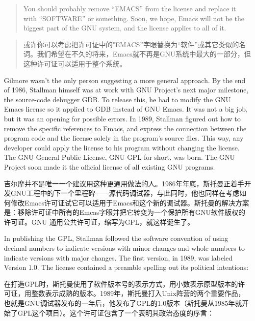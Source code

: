 \ifdefined\eng
\begin{quote}
You should probably remove ``EMACS'' from the license and replace it with ``SOFTWARE'' or something. Soon, we hope, Emacs will not be the biggest part of the GNU system, and the license applies to all of it.
\end{quote}
\fi

\ifdefined\chs
\begin{quote}
或许你可以考虑把许可证中的"EMACS''字眼替换为``软件''或其它类似的名词。我们希望在不久的将来，Emacs就不再是GNU系统中最大的一部分，但这种许可证可以适用于整个系统。 
\end{quote}
\fi

\ifdefined\eng
Gilmore wasn't the only person suggesting a more general approach. By the end of 1986, Stallman himself was at work with GNU Project's next major milestone, the source-code debugger GDB.  To release this, he had to modify the GNU Emacs license so it applied to GDB instead of GNU Emacs.  It was not a big job, but it was an opening for possible errors.  In 1989, Stallman figured out how to remove the specific references to Emacs, and express the connection between the program code and the license solely in the program's source files.  This way, any developer could apply the license to his program without changing the license. The GNU General Public License, GNU GPL for short, was born.  The GNU Project soon made it the official license of all existing GNU programs.
\fi

\ifdefined\chs
吉尔摩并不是唯一一个建议用这种更通用做法的人。1986年年底，斯托曼正着手开发GNU工程中的下一个里程碑——源代码调试器，与此同时，他也同样在考虑如何修改Emacs许可证试它可以适用于Emacs和这个新的调试器。斯托曼的解决方案是：移除许可证中所有的Emcas字眼并把它转变为一个保护所有GNU软件版权的许可证。GNU 通用公共许可证，缩写为GPL，就这样诞生了。
\fi

\ifdefined\eng
In publishing the GPL, Stallman followed the software convention of using decimal numbers to indicate versions with minor changes and whole numbers to indicate versions with major changes. The first version, in 1989, was labeled Version 1.0. The license contained a preamble spelling out its political intentions:
\fi

\ifdefined\chs
在打造GPL时，斯托曼使用了软件版本号的表示方式，用小数表示原型版本的许可证，用整数表示成熟的版本。1989年，斯托曼打入Unix阵营的两个重要作品，也就是GNU调试器发布的一年后，他发布了GPL的1.0版本（斯托曼从1985年就开始了GPL这个项目）。这个许可证包含了一个表明其政治态度的序言：
\fi

